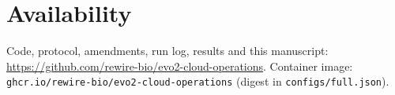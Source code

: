 \documentclass[11pt]{article}
\newcommand{\code}[1]{\texttt{#1}}
\begin{document}
\section{Availability}
Code, protocol, amendments, run log, results and this manuscript:
\url{https://github.com/rewire-bio/evo2-cloud-operations}. Container image:
\code{ghcr.io/rewire-bio/evo2-cloud-operations} (digest in \code{configs/full.json}).



\end{document}
